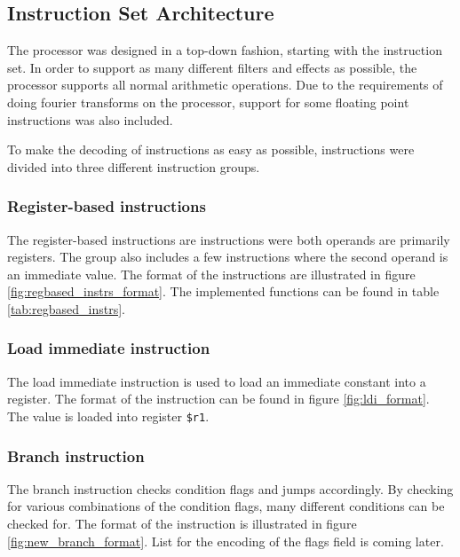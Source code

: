 \subsection{Instruction Set Architecture}\label{section:fpga-isa}

The processor was designed in a top-down fashion, starting with
the instruction set. In order to support as many different filters
and effects as possible, the processor supports all normal arithmetic
operations. Due to the requirements of doing fourier transforms on the
processor, support for some floating point instructions was also included.

To make the decoding of instructions as easy as possible, instructions
were divided into three different instruction groups.

\subsubsection{Register-based instructions}

The register-based instructions are instructions were both operands are
primarily registers. The group also includes a few instructions where
the second operand is an immediate value. The format of the
instructions are illustrated in figure \ref{fig:regbased_instrs_format}. The
implemented functions can be found in table \ref{tab:regbased_instrs}.





\subsubsection{Load immediate instruction}
The load immediate instruction is used to load an immediate constant into a
register. The format of the instruction can be found in figure
\ref{fig:ldi_format}. The value is loaded into register \texttt{\$r1}.



\subsubsection{Branch instruction}
The branch instruction checks condition flags and jumps accordingly. By
checking for various combinations of the condition flags, many different
conditions can be checked for. The format of the instruction is illustrated
in figure \ref{fig:new_branch_format}. List for the encoding of the flags field
is coming later.

